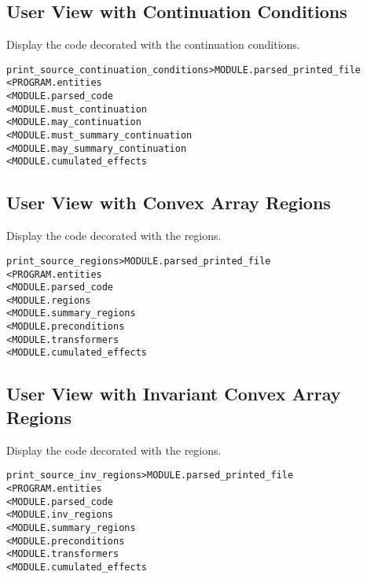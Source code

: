 \documentclass[a4paper]{report}
\newenvironment{PipsMake}{\begin{alltt}}{\end{alltt}}
\newenvironment{PipsPass}[1]{\label{pass:#1}}{}
\begin{document}
\subsection{User View with Continuation Conditions}

\begin{PipsPass}{print_source_continuation_conditions}
Display the code decorated with the continuation conditions.
\end{PipsPass}

\begin{PipsMake}
print_source_continuation_conditions   > MODULE.parsed_printed_file
        < PROGRAM.entities
        < MODULE.parsed_code
        < MODULE.must_continuation
        < MODULE.may_continuation
        < MODULE.must_summary_continuation
        < MODULE.may_summary_continuation
        < MODULE.cumulated_effects
\end{PipsMake}

\subsection{User View with Convex Array Regions}

\begin{PipsPass}{print_source_regions}
Display the code decorated with the regions.
\end{PipsPass}

\begin{PipsMake}
print_source_regions              > MODULE.parsed_printed_file
        < PROGRAM.entities
        < MODULE.parsed_code
        < MODULE.regions
        < MODULE.summary_regions
        < MODULE.preconditions
        < MODULE.transformers
        < MODULE.cumulated_effects
\end{PipsMake}

\subsection{User View with Invariant Convex Array  Regions}

\begin{PipsPass}{print_source_inv_regions}
Display the code decorated with the regions.
\end{PipsPass}

\begin{PipsMake}
print_source_inv_regions              > MODULE.parsed_printed_file
        < PROGRAM.entities
        < MODULE.parsed_code
        < MODULE.inv_regions
        < MODULE.summary_regions
        < MODULE.preconditions
        < MODULE.transformers
        < MODULE.cumulated_effects
\end{PipsMake}
\end{document}
